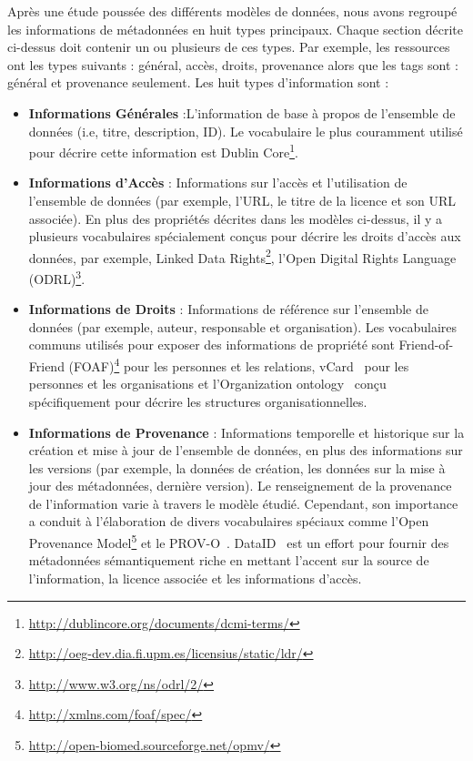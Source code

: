 Apr\`{e}s une \'{e}tude pouss\'{e}e des diff\'{e}rents mod\`{e}les de donn\'{e}es, nous avons regroup\'{e} les informations de m\'{e}tadonn\'{e}es en huit types principaux. Chaque section d\'{e}crite ci-dessus doit contenir un ou plusieurs de ces types. Par exemple, les ressources ont les types suivants : g\'{e}n\'{e}ral, acc\`{e}s, droits, provenance alors que les tags sont : g\'{e}n\'{e}ral et provenance seulement. Les huit types d'information sont :
\begin{itemize}
	\item \textbf{Informations G\'{e}n\'{e}rales} :L'information de base à propos de l'ensemble de donn\'{e}es (i.e, titre, description, ID). Le vocabulaire le plus couramment utilis\'{e} pour d\'{e}crire cette information est Dublin Core\footnote{\url{http://dublincore.org/documents/dcmi-terms/}}.
	\item \textbf{Informations d'Acc\`{e}s} : Informations sur l'acc\`{e}s et l'utilisation de l'ensemble de donn\'{e}es (par exemple, l'URL, le titre de la licence et son URL associ\'{e}e). En plus des propri\'{e}t\'{e}s d\'{e}crites dans les mod\`{e}les ci-dessus, il y a plusieurs vocabulaires sp\'{e}cialement conçus pour d\'{e}crire les droits d'acc\`{e}s aux donn\'{e}es, par exemple, Linked Data Rights\footnote{\url{http://oeg-dev.dia.fi.upm.es/licensius/static/ldr/}}, l'Open Digital Rights Language (ODRL)\footnote{\url{http://www.w3.org/ns/odrl/2/}}.
	\item \textbf{Informations de Droits} : Informations de r\'{e}f\'{e}rence sur l'ensemble de donn\'{e}es (par exemple, auteur, responsable et organisation). Les vocabulaires communs utilis\'{e}s pour exposer des informations de propri\'{e}t\'{e} sont Friend-of-Friend (FOAF)\footnote{\url{http://xmlns.com/foaf/spec/}} pour les personnes et les relations, vCard~\cite{Iannella:W3C:14} pour les personnes et les organisations et l'Organization ontology~\cite{Reynolds:W3C:14} conçu sp\'{e}cifiquement pour d\'{e}crire les structures organisationnelles.
	\item \textbf{Informations de Provenance} : Informations temporelle et historique sur la cr\'{e}ation et mise à jour de l'ensemble de donn\'{e}es, en plus des informations sur les versions (par exemple, la donn\'{e}es de cr\'{e}ation, les donn\'{e}es sur la mise à jour des m\'{e}tadonn\'{e}es, derni\`{e}re version). Le renseignement de la provenance de l'information varie à travers le mod\`{e}le \'{e}tudi\'{e}. Cependant, son importance a conduit à l'\'{e}laboration de divers vocabulaires sp\'{e}ciaux comme l'Open Provenance Model\footnote{\url{http://open-biomed.sourceforge.net/opmv/}} et le PROV-O~\cite{Lebo:W3C:13}. DataID~\cite{Brummer::ICSS:14} est un effort pour fournir des m\'{e}tadonn\'{e}es s\'{e}mantiquement riche en mettant l'accent sur la source de l'information, la licence associ\'{e}e et les informations d'acc\`{e}s.

\end{itemize}
